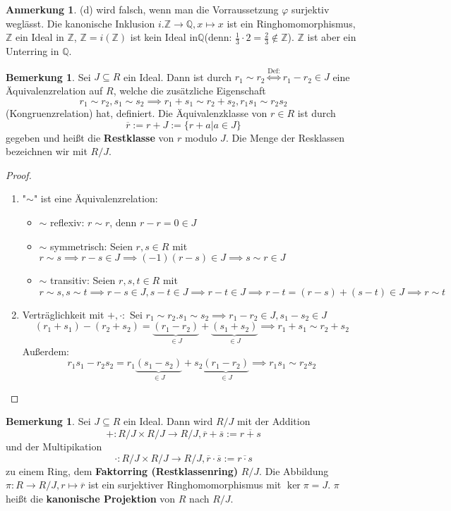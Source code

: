\documentclass[a4paper, titlepage]{article}
\theoremstyle{definition}
\newtheorem{bem}[satz]{Bemerkung}
\newtheorem*{anm}{Anmerkung}
\newcommand{\Z}{\mathbb{Z}}
\newcommand{\Q}{\mathbb{Q}}
\begin{document}
\begin{anm}
 (d) wird falsch, wenn man die Vorraussetzung $\varphi$ surjektiv weglässt. Die kanonische Inklusion $i.\Z\longrightarrow\Q, x\longmapsto x$ ist ein Ringhomomorphismus, $\Z$ ein Ideal in $\Z$, $\Z=i(\Z)$ ist kein Ideal in$\Q$(denn: $\frac{1}{3}\cdot 2 = \frac{2}{3}\notin\Z$). $\Z$ ist aber ein Unterring in $\Q$.
\end{anm}
 \begin{bem}
	Sei $J\subseteq R$ ein Ideal. Dann ist durch $r_1\sim r_2 \overset{\text{Def:}}{\Leftrightarrow}r_1-r_2\in J$ eine Äquivalenzrelation auf $R$, welche die zusätzliche Eigenschaft
	$$r_1\sim r_2 , s_1\sim s_2 \implies r_1+s_1 \sim r_2 + s_2, r_1s_1\sim r_2s_2$$
	(Kongruenzrelation) hat, definiert. Die Äquivalenzklasse von $r\in R$ ist durch 
	$$\overline{r}:=r+J:=\{r+a|a\in J\}$$
	gegeben und heißt die \textbf{Restklasse} von $r$ modulo $J$. Die Menge der Resklassen bezeichnen wir mit $R/J$.
\end{bem}
\begin{proof}
	\begin{enumerate}[(1.)]
		\item "$\sim$" ist eine Äquivalenzrelation:
		\begin{itemize}
			\item $ \sim$ reflexiv: $ r\sim r$, denn $r-r=0\in J$
			\item $\sim$ symmetrisch: Seien $r,s\in R$ mit $r\sim s \implies r-s \in J \implies (-1)(r-s)\in J \implies s \sim r \in J$
			\item $\sim$ transitiv: Seien $r,s,t\in R $ mit $r\sim s, s \sim t \implies r-s\in J, s-t\in J\implies r-t\in J\implies r-t=(r-s)+(s-t)\in J\implies r \sim t$
		\end{itemize}
	\item Verträglichkeit mit $+,\cdot:$ Sei $r_1\sim r_2. s_1\sim s_2 \implies r_1-r_2\in J, s_1-s_2\in J$
			$$(r_1+s_1)-(r_2+s_2)=\underbrace{(r_1-r_2)}_{\in J}+\underbrace{(s_1+s_2)}_{\in J}	\implies r_1+s_1\sim r_2+s_2$$
			Außerdem:
			$$r_1s_1-r_2s_2=r_1\underbrace{(s_1-s_2)}_{\in J}+s_2\underbrace{(r_1-r_2)}_{\in J} \implies r_1s_1\sim r_2s_2$$
	\end{enumerate}
\end{proof}
\begin{bem}
	Sei $J \subseteq R$ ein Ideal. Dann wird $R/J$ mit der Addition 
	$$+: R/J \times R/J \longrightarrow R/J, \overline{r}+\overline{s}:= \overline{r+s}$$
	und der Multipikation 
	$$\cdot: R/J\times R/J \longrightarrow R/J, \overline{r}\cdot \overline{s}:=\overline{r\cdot s}$$
	zu einem Ring, dem \textbf{Faktorring (Restklassenring)} $R/J$. Die Abbildung $\pi:R \longrightarrow R/J, r\mapsto\overline{r}$ ist ein surjektiver Ringhomomorphismus mit $\operatorname{ker}\pi=J$.
	$\pi$ heißt die  \textbf{kanonische Projektion} von $R$ nach $R/J$.
\end{bem}
\end{document}
